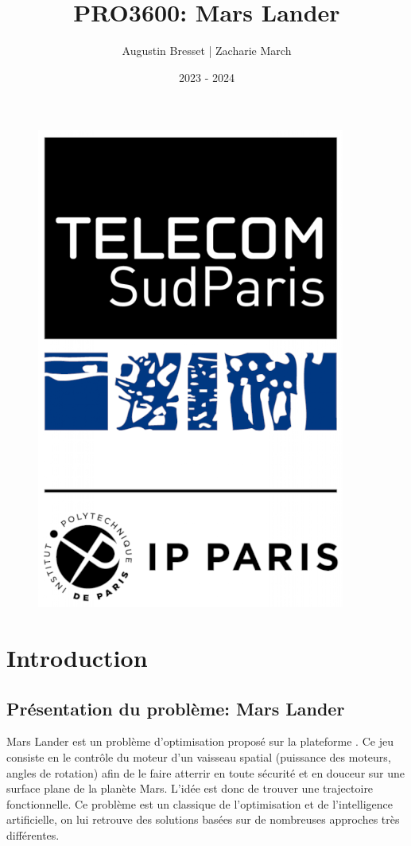 \documentclass[french,a4paper,10pt,twocolumn]{article}
\title{PRO3600: Mars Lander}
\author{Augustin Bresset | Zacharie March}
\date{2023 - 2024}
\begin{document}
\onecolumn
\maketitle

\begin{figure}[H]
    \centering
    \includegraphics[scale=0.2]{images/logo-tsp-fond-blanc.png}
\end{figure}

\tableofcontents
\pagebreak
\section{Introduction}

\subsection{Présentation du problème: Mars Lander}

Mars Lander est un problème d'optimisation proposé sur la plateforme \cite[]{codingame_mars_lander}.
Ce jeu consiste en le contrôle du moteur d'un vaisseau spatial (puissance des moteurs, angles de rotation) 
afin de le faire atterrir en toute sécurité et en douceur sur une surface plane de la planète Mars. 
L'idée est donc de trouver une trajectoire fonctionnelle. Ce problème est un classique de l'optimisation et de l'intelligence artificielle,
on lui retrouve des solutions basées sur de nombreuses approches très différentes.
\end{document}
